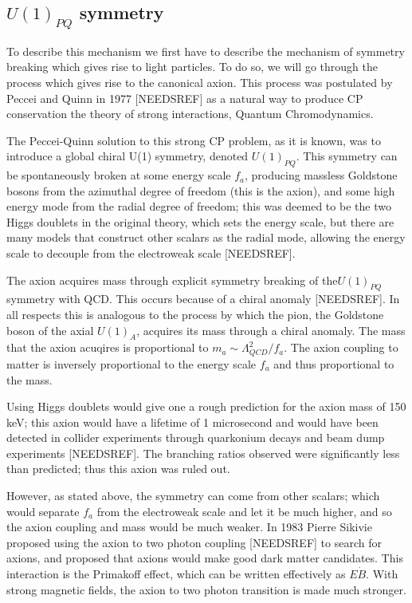 \documentclass[11pt]{book}
\begin{document}
\subsection{$U(1)_{PQ}$ symmetry}

To describe this mechanism we first have to describe the mechanism of symmetry breaking which gives rise to light particles. To do so, we will go through the process which gives rise to the canonical axion. This process was postulated by Peccei and Quinn in 1977 [NEEDSREF] as a natural way to produce CP conservation the theory of strong interactions, Quantum Chromodynamics. 

The Peccei-Quinn solution to this strong CP problem, as it is known, was to introduce a global chiral U(1) symmetry, denoted $U(1)_{PQ}$. This symmetry can be spontaneously broken at some energy scale $f_a$, producing massless Goldstone bosons from the azimuthal degree of freedom (this is the axion), and some high energy mode from the radial degree of freedom; this was deemed to be the two Higgs doublets in the original theory, which sets the energy scale, but there are many models that construct other scalars as the radial mode, allowing the energy scale to decouple from the electroweak scale [NEEDSREF].

The axion acquires mass through explicit symmetry breaking of the$U(1)_{PQ}$ symmetry with QCD. This occurs because of a chiral anomaly [NEEDSREF]. In all respects this is analogous to the process by which the pion, the Goldstone boson of the axial $U(1)_A$, acquires its mass through a chiral anomaly. The mass that the axion acuqires is proportional to $m_a \sim \Lambda_{QCD}^2/f_a$. The axion coupling to matter is inversely proportional to the energy scale $f_a$ and thus proportional to the mass.

Using Higgs doublets would give one a rough prediction for the axion mass of 150 keV; this axion would have a lifetime of 1 microsecond and would have been detected in collider experiments through quarkonium decays and beam dump experiments [NEEDSREF]. The branching ratios observed were significantly less than predicted; thus this axion was ruled out.

However, as stated above, the symmetry can come from other scalars; which would separate $f_a$ from the electroweak scale and let it be much higher, and so the axion coupling and mass would be much weaker. In 1983 Pierre Sikivie proposed using the axion to two photon coupling [NEEDSREF] to search for axions, and proposed that axions would make good dark matter candidates. This interaction is the Primakoff effect, which can be written effectively as $E \dot B$. With strong magnetic fields, the axion to two photon transition is made much stronger.
\end{document}
